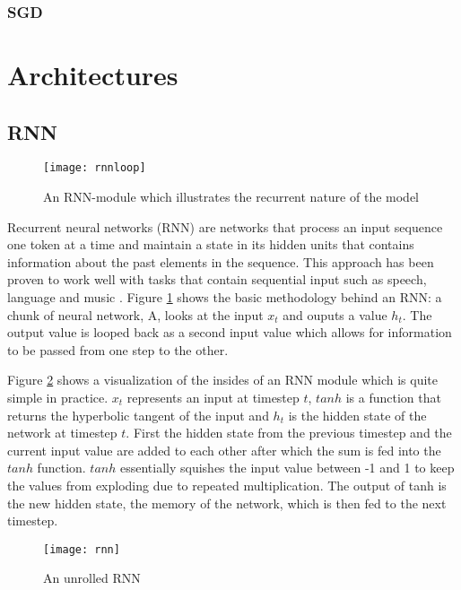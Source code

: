 \subsubsection{SGD}

\subsubsection{}


\section{Architectures} \label{Architectures}

\subsection{RNN} \label{RNN}
\begin{figure}[t]
\texttt{[image: rnnloop]}
\centering
\caption{An RNN-module which illustrates the recurrent nature of the model}
\label{fig:rnnloop}
\end{figure}

Recurrent neural networks (RNN) are networks that process an input sequence one token at a time and maintain a state in its hidden units that contains information about the past elements in the sequence.
This approach has been proven to work well with tasks that contain sequential input such as speech, language and music \cite{lecun2015}.
Figure \ref{fig:rnnloop} shows the basic methodology behind an RNN: a chunk of neural network, A, looks at the input $x_t$ and ouputs a value $h_t$. The output value is looped back as a second input value which allows for information to be passed from one step to the other.

Figure \ref{fig:rnn} shows a visualization of the insides of an RNN module which is quite simple in practice. $x_t$ represents an input at timestep $t$, $tanh$ is a function that returns the hyperbolic tangent of the input and $h_t$ is the hidden state of the network at timestep $t$.
First the hidden state from the previous timestep and the current input value are added to each other after which the sum is fed into the $tanh$ function.
$tanh$ essentially squishes the input value between -1 and 1 to keep the values from exploding due to repeated multiplication.
The output of tanh is the new hidden state, the memory of the network, which is then fed to the next timestep.

\begin{figure}[t]
\texttt{[image: rnn]}
\centering
\caption{An unrolled RNN}
\label{fig:rnn}
\end{figure}

